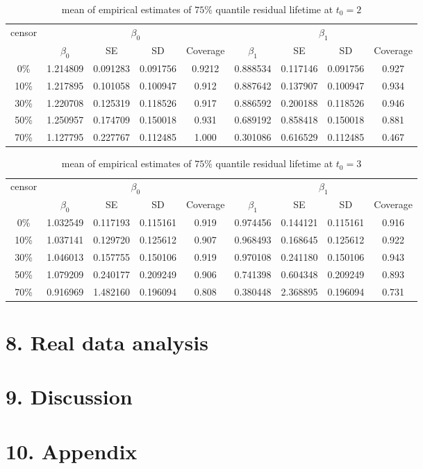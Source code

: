 \documentclass[12pt]{article}
\begin{document}
	\begin{table}[hbt!]
		\caption{mean of empirical estimates of $75\%$ quantile residual lifetime at $t_0=2$}
		\centering
		\begin{tabular}{|c|c|c|c|c|c|c|c|c|}
			\hline
			\multirow{2}{*}{censor} & \multicolumn{4}{c|}{$\beta_0$} & \multicolumn{4}{c|}{$\beta_1$}\\ \cline{2-9}
			& $\beta_0$ & SE & SD  & Coverage  & $\beta_1$ & SE & SD & Coverage\\
			\hline\hline
			0\% & 1.214809 & 0.091283 & 0.091756 & 0.9212 & 0.888534 & 0.117146 & 0.091756 & 0.927 \\
			10\% & 1.217895 & 0.101058 & 0.100947 & 0.912 & 0.887642 & 0.137907 & 0.100947 & 0.934 \\
			30\% & 1.220708 & 0.125319 & 0.118526 & 0.917 & 0.886592 & 0.200188 & 0.118526 & 0.946 \\
			50\% & 1.250957 & 0.174709 & 0.150018 & 0.931 & 0.689192 & 0.858418 & 0.150018 & 0.881 \\
			70\% & 1.127795 & 0.227767 & 0.112485 & 1.000 & 0.301086 & 0.616529 & 0.112485 & 0.467 \\ 
			\hline
		\end{tabular}
	\end{table}
	\begin{table}[hbt!]
		\caption{mean of empirical estimates of $75\%$ quantile residual lifetime at $t_0=3$}
		\centering
		\begin{tabular}{|c|c|c|c|c|c|c|c|c|}
			\hline
			\multirow{2}{*}{censor} & \multicolumn{4}{c|}{$\beta_0$} & \multicolumn{4}{c|}{$\beta_1$}\\ \cline{2-9}
			& $\beta_0$ & SE & SD  & Coverage  & $\beta_1$ & SE & SD & Coverage\\
			\hline\hline
			0\% & 1.032549 & 0.117193 & 0.115161 & 0.919 & 0.974456 & 0.144121 & 0.115161 & 0.916 \\
			10\% & 1.037141 & 0.129720 & 0.125612 & 0.907 & 0.968493 & 0.168645 & 0.125612 & 0.922 \\
			30\% & 1.046013 & 0.157755 & 0.150106 & 0.919 & 0.970108 & 0.241180 & 0.150106 & 0.943 \\
			50\% & 1.079209 & 0.240177 & 0.209249 & 0.906 & 0.741398 & 0.604348 & 0.209249 & 0.893 \\
			70\% & 0.916969 & 1.482160 & 0.196094 & 0.808 & 0.380448 & 2.368895 & 0.196094 & 0.731 \\ 
			\hline
		\end{tabular}
	\end{table}
\section{8. Real data analysis}
	
\section{9. Discussion}
	
\section{10. Appendix}
	
	
\end{document}
